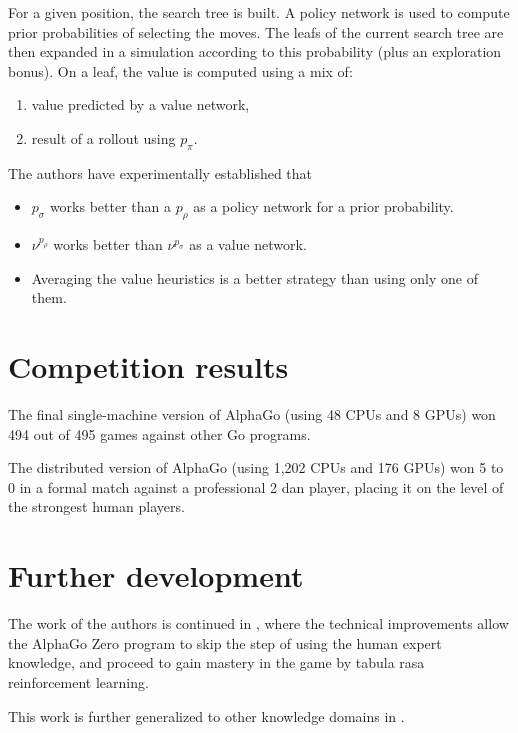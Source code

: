 \documentclass[oneside]{article}   	%
\begin{document}
For a given position, the search tree is built. A policy network is used to compute prior probabilities of selecting the moves. The leafs of the current search tree are then expanded in a simulation according to this probability (plus an exploration bonus). On a leaf, the value is computed using a mix of:
\begin{enumerate}
\item value predicted by a value network,
\item result of a rollout using $p_\pi$.
\end{enumerate}


The authors have experimentally established that
\begin{itemize}
\item $p_\sigma$ works better than a $p_\rho$ as a policy network for a prior probability.
\item $\nu^{p_\rho}$ works better than $\nu^{p_\sigma}$ as a value network.
\item Averaging the value heuristics is a better strategy than using only one of them. 
\end{itemize}


\section{Competition results}

The final single-machine version of AlphaGo (using 48 CPUs and 8 GPUs) won 494 out of 495 games against other Go programs. 

The distributed version of AlphaGo (using 1,202 CPUs and 176 GPUs) won 5 to 0 in a formal match against a professional 2 dan player, placing it on the level of the strongest human players.

\section{Further development}

The work of the authors is continued in \cite{silver2017mastering}, where the technical improvements allow the AlphaGo Zero program to skip the step of using the human expert knowledge, and proceed to gain mastery in the game by tabula rasa reinforcement learning. 

This work is further generalized to other knowledge domains in \cite{2017arXivSilver}.



\end{document}
